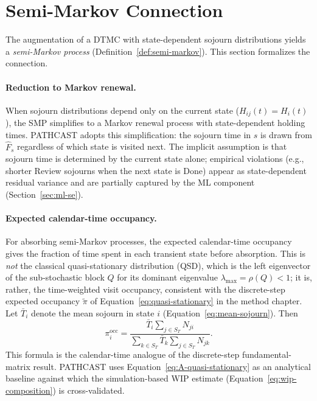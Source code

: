 \section{Semi-Markov Connection}
\label{app:A-semi-markov}

The augmentation of a DTMC with state-dependent sojourn distributions
yields a \emph{semi-Markov process} (Definition~\ref{def:semi-markov}).
This section formalizes the connection.

\paragraph{Reduction to Markov renewal.} When sojourn distributions depend
only on the current state ($H_{ij}(t) = H_i(t)$), the SMP simplifies to a
Markov renewal process with state-dependent holding times. PATHCAST adopts
this simplification: the sojourn time in $s$ is drawn from $\hat{F}_s$
regardless of which state is visited next. The implicit assumption is
that sojourn time is determined by the current state alone; empirical
violations (e.g., shorter Review sojourns when the next state is Done)
appear as state-dependent residual variance and are partially captured by
the ML component (Section~\ref{sec:ml-se}).

\paragraph{Expected calendar-time occupancy.} For absorbing semi-Markov
processes, the expected calendar-time occupancy gives the fraction
of time spent in each transient state before absorption. This is
\emph{not} the classical quasi-stationary distribution (QSD), which is the
left eigenvector of the sub-stochastic block $Q$ for its dominant eigenvalue
$\lambda_{\max}=\rho(Q)<1$; it is, rather, the time-weighted visit
occupancy, consistent with the discrete-step expected occupancy
$\tilde{\pi}$ of Equation~\ref{eq:quasi-stationary} in the method chapter.
Let $\bar{T}_i$ denote the mean sojourn in state $i$
(Equation~\ref{eq:mean-sojourn}). Then
\begin{equation}
\label{eq:A-quasi-stationary}
\pi^{\text{occ}}_i = \frac{\bar{T}_i \sum_{j \in S_T} N_{ji}}
              {\sum_{k \in S_T} \bar{T}_k \sum_{j \in S_T} N_{jk}}.
\end{equation}
This formula is the calendar-time analogue of the discrete-step
fundamental-matrix result. PATHCAST uses
Equation~\ref{eq:A-quasi-stationary} as an analytical baseline against
which the simulation-based WIP estimate
(Equation~\ref{eq:wip-composition}) is cross-validated.


